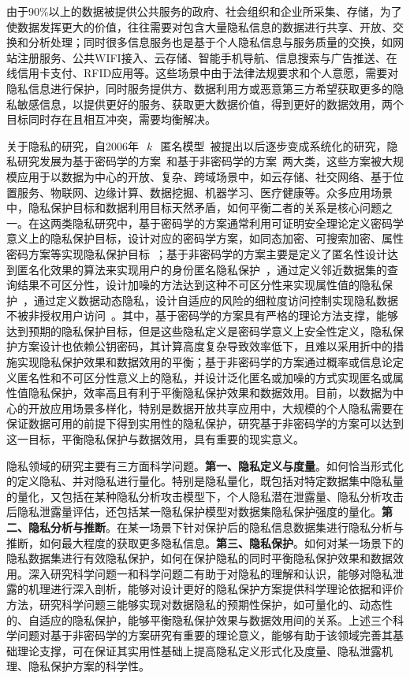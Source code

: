 由于90\%以上的数据被提供公共服务的政府、社会组织和企业所采集、存储，为了使数据发挥更大的价值，往往需要对包含大量隐私信息的数据进行共享、开放、交换和分析处理；同时很多信息服务也是基于个人隐私信息与服务质量的交换，如网站注册服务、公共WIFI接入、云存储、智能手机导航、信息搜索与广告推送、在线信用卡支付、RFID应用等。这些场景中由于法律法规要求和个人意愿，需要对隐私信息进行保护，同时服务提供方、数据利用方或恶意第三方希望获取更多的隐私敏感信息，以提供更好的服务、获取更大数据价值，得到更好的数据效用，两个目标同时存在且相互冲突，需要均衡解决。

关于隐私的研究，自2006年~$~k~$~匿名模型~\cite{sweeney2002k}被提出以后逐步变成系统化的研究，隐私研究发展为基于密码学的方案~\cite{nabeel2014privacy,huang2015review}和基于非密码学的方案~\cite{sweeney2002k,machanavajjhala2007l,li2007t,dwork2006differential,zhang2018privacy}两大类，这些方案被大规模应用于以数据为中心的开放、复杂、跨域场景中，如云存储、社交网络、基于位置服务、物联网、边缘计算、数据挖掘、机器学习、医疗健康等。众多应用场景中，隐私保护目标和数据利用目标天然矛盾，如何平衡二者的关系是核心问题之一。在这两类隐私研究中，基于密码学的方案通常利用可证明安全理论定义密码学意义上的隐私保护目标，设计对应的密码学方案，如同态加密、可搜索加密、属性密码方案等实现隐私保护目标~\cite{nabeel2014privacy,huang2015review}；基于非密码学的方案主要是定义了匿名性设计达到匿名化效果的算法来实现用户的身份匿名隐私保护~\cite{sweeney2002k,machanavajjhala2007l,li2007t}，通过定义邻近数据集的查询结果不可区分性，设计加噪的方法达到这种不可区分性来实现属性值的隐私保护~\cite{dwork2006differential}，通过定义数据动态隐私，设计自适应的风险的细粒度访问控制实现隐私数据不被非授权用户访问~\cite{zhang2018privacy}。其中，基于密码学的方案具有严格的理论方法支撑，能够达到预期的隐私保护目标，但是这些隐私定义是密码学意义上安全性定义，隐私保护方案设计也依赖公钥密码，其计算高度复杂导致效率低下，且难以采用折中的措施实现隐私保护效果和数据效用的平衡；基于非密码学的方案通过概率或信息论定义匿名性和不可区分性意义上的隐私，并设计泛化匿名或加噪的方式实现匿名或属性值隐私保护，效率高且有利于平衡隐私保护效果和数据效用。目前，以数据为中心的开放应用场景多样化，特别是数据开放共享应用中，大规模的个人隐私需要在保证数据可用的前提下得到实用性的隐私保护，研究基于非密码学的方案可以达到这一目标，平衡隐私保护与数据效用，具有重要的现实意义。

隐私领域的研究主要有三方面科学问题。\textbf{第一、隐私定义与度量}。如何恰当形式化的定义隐私、并对隐私进行量化。特别是隐私量化，既包括对特定数据集中隐私量的量化，又包括在某种隐私分析攻击模型下，个人隐私潜在泄露量、隐私分析攻击后隐私泄露量评估，还包括某一隐私保护模型对数据集隐私保护强度的量化。\textbf{第二、隐私分析与推断}。在某一场景下针对保护后的隐私信息数据集进行隐私分析与推断，如何最大程度的获取更多隐私信息。\textbf{第三、隐私保护}。如何对某一场景下的隐私数据集进行有效隐私保护，如何在保护隐私的同时平衡隐私保护效果和数据效用。深入研究科学问题一和科学问题二有助于对隐私的理解和认识，能够对隐私泄露的机理进行深入剖析，能够对设计更好的隐私保护方案提供科学理论依据和评价方法，研究科学问题三能够实现对数据隐私的预期性保护，如可量化的、动态性的、自适应的隐私保护，能够平衡隐私保护效果与数据效用间的关系。上述三个科学问题对基于非密码学的方案研究有重要的理论意义，能够有助于该领域完善其基础理论支撑，可在保证其实用性基础上提高隐私定义形式化及度量、隐私泄露机理、隐私保护方案的科学性。

